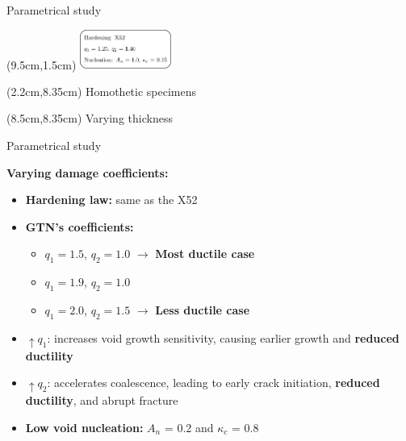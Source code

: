 \documentclass[9pt]{beamer}
\begin{document}
\begin{frame}{Parametrical study}
    \begin{textblock*}{3cm}(9.5cm,1.5cm) %
        \includegraphics[width=3cm]{Images/coeffs_X52.pdf}
    \end{textblock*}

    \begin{textblock*}{5cm}(2.2cm,8.35cm)
        \small Homothetic specimens
    \end{textblock*}

    \begin{textblock*}{5cm}(8.5cm,8.35cm)
        \small Varying thickness
    \end{textblock*}
    
\end{frame}


\begin{frame}{Parametrical study}

	\textcolor{MINESBlue}{\textbf{\large Varying damage coefficients:}}
	\vspace{0.3cm}
    \begin{itemize}
        \item \textbf{Hardening law:} same as the X52
        \vspace{0.5cm}
        \item \textbf{GTN's coefficients:}
        \vspace{0.2cm}
        \begin{itemize}
            \item $q_1 = 1.5$, $q_2 = 1.0$ $\rightarrow$ \textbf{Most ductile case}
            \vspace{0.2cm}
            \item $q_1 = 1.9$, $q_2 = 1.0$
            \vspace{0.2cm}
            \item $q_1 = 2.0$, $q_2 = 1.5$ $\rightarrow$ \textbf{Less ductile case}
        \end{itemize}
        \vspace{0.4cm}
        \item $\uparrow q_1$: increases void growth sensitivity, causing earlier growth and \textbf{reduced ductility}
        \vspace{0.2cm}
        \item $\uparrow q_2$: accelerates coalescence, leading to early crack initiation, \textbf{reduced ductility}, and abrupt fracture
        \vspace{0.2cm}
        \item \textbf{Low void nucleation:} $A_n$ = 0.2 and $\kappa_c$ = 0.8
    \end{itemize}

\end{frame}
\end{document}
